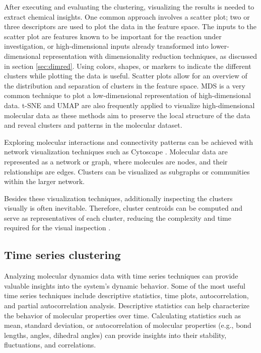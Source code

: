 \documentclass[9pt,bestpractices]{livecoms}
\begin{document}
After executing and evaluating the clustering, visualizing the results is needed to extract chemical insights. One common approach involves a scatter plot; two or three descriptors are used to plot the data in the feature space. The inputs to the scatter plot are features known to be important for the reaction under investigation, or high-dimensional inputs already transformed into lower-dimensional representation with dimensionality reduction techniques, as discussed in section \ref{sec:dimred}. Using colors, shapes, or markers to indicate the different clusters while plotting the data is useful. Scatter plots allow for an overview of the distribution and separation of clusters in the feature space. MDS is a very common technique to plot a low-dimensional representation of high-dimensional data. t-SNE and UMAP are also frequently applied to visualize high-dimensional molecular data as these methods aim to preserve the local structure of the data and reveal clusters and patterns in the molecular dataset.

Exploring molecular interactions and connectivity patterns can be achieved with network visualization techniques such as Cytoscape \cite{RN16}. Molecular data are represented as a network or graph, where molecules are nodes, and their relationships are edges. Clusters can be visualized as subgraphs or communities within the larger network.

Besides these visualization techniques, additionally inspecting the clusters visually is often inevitable. Therefore, cluster centroids can be computed and serve as representatives of each cluster, reducing the complexity and time required for the visual inspection \cite{RN104, RN148}.

\subsection{Time series clustering}
\label{sec:timeclustering}

Analyzing molecular dynamics data with time series techniques can provide valuable insights into the system's dynamic behavior. Some of the most useful time series techniques include descriptive statistics, time plots, autocorrelation, and partial autocorrelation analysis. Descriptive statistics can help characterize the behavior of molecular properties over time. Calculating statistics such as mean, standard deviation, or autocorrelation of molecular properties (e.g., bond lengths, angles, dihedral angles) can provide insights into their stability, fluctuations, and correlations.
\end{document}
